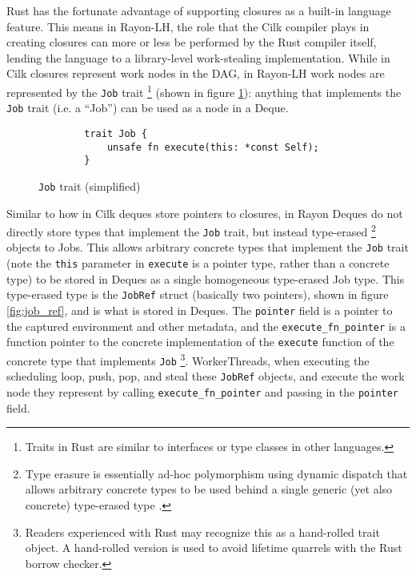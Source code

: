 \documentclass[bsc,frontabs,singlespacing,parskip,deptreport,normalheadings]{infthesis}
\begin{document}
Rust has the fortunate advantage of supporting closures as a built-in language
feature. This means in Rayon-LH, the role that the Cilk compiler plays in
creating closures can more or less be performed by the Rust compiler itself,
lending the language to a library-level work-stealing implementation. While in
Cilk closures represent work nodes in the DAG, in Rayon-LH work nodes are
represented by the \texttt{Job} trait \footnote{Traits in Rust are similar to
interfaces or type classes in other languages.} (shown in figure
\ref{fig:job_trait}): anything that implements the \texttt{Job} trait (i.e. a
``Job'') can be used as a node in a Deque.

\begin{figure}[ht]
    \begin{verbatim}
        trait Job {
            unsafe fn execute(this: *const Self);
        }
    \end{verbatim}
    \caption{\texttt{Job} trait (simplified)}
    \label{fig:job_trait}
\end{figure}

Similar to how in Cilk deques store pointers to closures, in Rayon Deques do not
directly store types that implement the \texttt{Job} trait, but instead
type-erased \footnote{Type erasure is essentially ad-hoc polymorphism using
    dynamic dispatch that allows arbitrary concrete types to be used behind a
single generic (yet also concrete) type-erased type \cite{kilian_c_nodate}.}
objects to Jobs. This allows arbitrary concrete types that implement the
\texttt{Job} trait (note the \texttt{this} parameter in \texttt{execute} is a
pointer type, rather than a concrete type) to be stored in Deques as a single
homogeneous type-erased Job type. This type-erased type is the \texttt{JobRef}
struct (basically two pointers), shown in figure \ref{fig:job_ref}, and is what
is stored in Deques. The \texttt{pointer} field is a pointer to the captured
environment and other metadata, and the \texttt{execute\_fn\_pointer} is a
function pointer to the concrete implementation of the \texttt{execute} function
of the concrete type that implements \texttt{Job} \footnote{Readers experienced
with Rust may recognize this as a hand-rolled trait object. A hand-rolled
version is used to avoid lifetime quarrels with the Rust borrow checker.}.
WorkerThreads, when executing the scheduling loop, push, pop, and steal these
\texttt{JobRef} objects, and execute the work node they represent by calling
\texttt{execute\_fn\_pointer} and passing in the \texttt{pointer} field.
\end{document}
